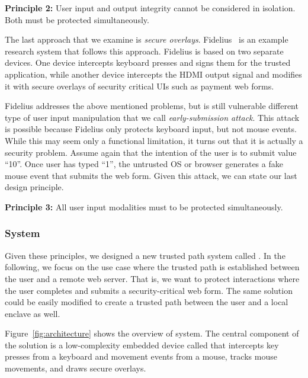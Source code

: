 \begin{tcolorbox}
\textbf{Principle 2:} User input and output integrity cannot be considered in isolation. Both must be protected simultaneously.
\end{tcolorbox}

The last approach that we examine is \emph{secure overlays}. Fidelius~\cite{Fidelius} is an example research system that follows this approach. Fidelius is based on two separate devices. One device intercepts keyboard presses and signs them for the trusted application, while another device intercepts the HDMI output signal and modifies it with secure overlays of security critical UIs such as payment web forms. 

Fidelius addresses the above mentioned problems, but is still vulnerable different type of user input manipulation that we call \emph{early-submission attack}. This attack is possible because Fidelius only protects keyboard input, but not mouse events. While this may seem only a functional limitation, it turns out that it is actually a security problem. Assume again that the intention of the user is to submit value ``10''. Once user has typed ``1'', the untrusted OS or browser generates a fake mouse event that submits the web form. Given this attack, we can state our last design principle.

\begin{tcolorbox}
\textbf{Principle 3:} All user input modalities must to be protected simultaneously.
\end{tcolorbox}


\subsubsection*{\protection System}

Given these principles, we designed a new trusted path system called \protection. In the following, we focus on the use case where the trusted path is established between the user and a remote web server. That is, we want to protect interactions where the user completes and submits a security-critical web form. The same solution could be easily modified to create a trusted path between the user and a local enclave as well.

Figure~\ref{fig:architecture} shows the overview of \protection system. The central component of the solution is a low-complexity embedded device called \hub that intercepts key presses from a keyboard and movement events from a mouse, tracks mouse movements, and draws secure overlays. 

